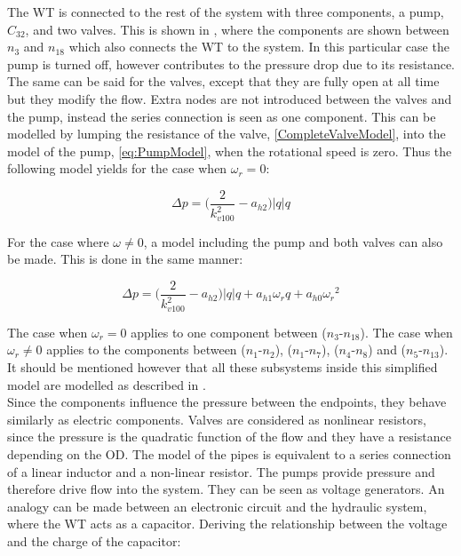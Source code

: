 The WT is connected to the rest of the system with three components, a pump, $C_{32}$, and two valves. This is shown in , where the components are shown between $n_3$ and $n_{18}$ which also connects the WT to the system. In this particular case the pump is turned off, however contributes to the pressure drop due to its resistance. The same can be said for the valves, except that they are fully open at all time but they modify the flow. Extra nodes are not introduced between the valves and the pump, instead the series connection is seen as one component. This can be modelled by lumping the resistance of the valve, \eqref{CompleteValveModel}, into the model of the pump, \eqref{eq:PumpModel}, when the rotational speed is zero. Thus the following model yields for the case when $\omega_r = 0$:

\begin{equation}
  \Delta p = \Big(\frac{2}{k_{v100}^2} - a_{h2}\Big)|q| q 
  \label{omega_zero}
\end{equation}

For the case where $\omega \neq 0$, a model including the pump and both valves can also be made. This is done in the same manner: 

\begin{equation}
  \Delta p = \Big(\frac{2}{k_{v100}^2} - a_{h2}\Big)|q| q  + a_{h1} \omega_r q + a_{h0}{\omega_r}^2
  \label{omega_notzero}
\end{equation}

The case when $\omega_r = 0$ applies to one component between ($n_3$-$n_{18}$). The case when $\omega_r \neq 0$ applies to the components between ($n_1$-$n_2$), ($n_1$-$n_7$), ($n_4$-$n_8$) and ($n_5$-$n_{13}$). It should be mentioned however that all these subsystems inside this simplified model are modelled as described in . 
\\
Since the components influence the pressure between the endpoints, they behave similarly as electric components. Valves are considered as nonlinear resistors, since the pressure is the quadratic function of the flow and they have a resistance depending on the OD.
The model of the pipes is equivalent to a series connection of a linear inductor and a non-linear resistor. %
The pumps provide pressure and therefore drive flow into the system. They can be seen as voltage generators. An analogy can be made between an electronic circuit and the hydraulic system, where the WT acts as a capacitor.  Deriving the relationship between the voltage and the charge of the capacitor:

